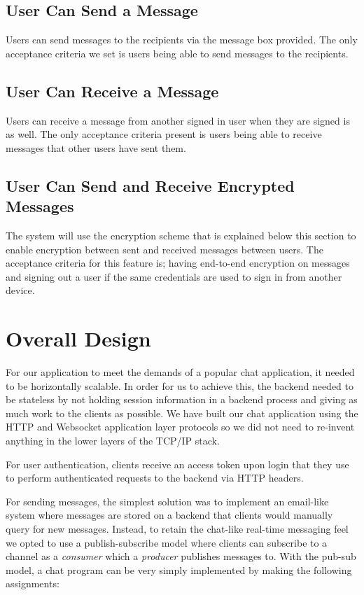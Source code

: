 \documentclass[11pt,a4paper]{report}
\begin{document}
\subsection{User Can Send a Message}
Users can send messages to the recipients via the message box provided. The only acceptance criteria we set is users being able to send messages to the recipients.
\subsection{User Can Receive a Message}
Users can receive a message from another signed in user when they are signed is as well. The only acceptance criteria present is users being able to receive messages that other users have sent them.
\subsection{User Can Send and Receive Encrypted Messages}
The system will use the encryption scheme that is explained below this section to enable encryption between sent and received messages between users. The acceptance criteria for this feature is; having end-to-end encryption on messages and signing out a user if the same credentials are used to sign in from another device.

\section{Overall Design}

For our application to meet the demands of a popular chat application, it needed to be horizontally scalable. In order for us to achieve this, the backend needed to be stateless by not holding session information in a backend process and giving as much work to the clients as possible. We have built our chat application using the HTTP and Websocket application layer protocols so we did not need to re-invent anything in the lower layers of the TCP/IP stack.

For user authentication, clients receive an access token upon login that they use to perform authenticated requests to the backend via HTTP headers.

For sending messages, the simplest solution was to implement an email-like system where messages are stored on a backend that clients would manually query for new messages. Instead, to retain the chat-like real-time messaging feel we opted to use a publish-subscribe model where clients can subscribe to a channel as a \emph{consumer} which a \emph{producer} publishes messages to. With the pub-sub model, a chat program can be very simply implemented by making the following assignments:
\end{document}
